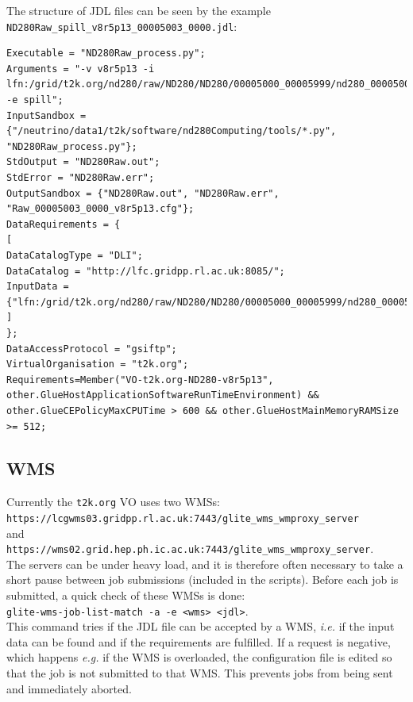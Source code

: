 \documentclass[11pt]{article}
\begin{document}
The structure of JDL files can be seen by the example \verb+ND280Raw_spill_v8r5p13_00005003_0000.jdl+:\\
\begin{verbatim}
Executable = "ND280Raw_process.py";
Arguments = "-v v8r5p13 -i
lfn:/grid/t2k.org/nd280/raw/ND280/ND280/00005000_00005999/nd280_00005003_0000.daq.mid.gz
-e spill";
InputSandbox = {"/neutrino/data1/t2k/software/nd280Computing/tools/*.py",
"ND280Raw_process.py"};
StdOutput = "ND280Raw.out";
StdError = "ND280Raw.err";
OutputSandbox = {"ND280Raw.out", "ND280Raw.err", "Raw_00005003_0000_v8r5p13.cfg"};
DataRequirements = {
[
DataCatalogType = "DLI";
DataCatalog = "http://lfc.gridpp.rl.ac.uk:8085/";
InputData =
{"lfn:/grid/t2k.org/nd280/raw/ND280/ND280/00005000_00005999/nd280_00005003_0000.daq.mid.gz"};
]
};
DataAccessProtocol = "gsiftp";
VirtualOrganisation = "t2k.org";
Requirements=Member("VO-t2k.org-ND280-v8r5p13",
other.GlueHostApplicationSoftwareRunTimeEnvironment) &&
other.GlueCEPolicyMaxCPUTime > 600 && other.GlueHostMainMemoryRAMSize >= 512;
\end{verbatim}

\subsection{WMS}
Currently the \verb+t2k.org+ VO uses two WMSs:\\
\verb+https://lcgwms03.gridpp.rl.ac.uk:7443/glite_wms_wmproxy_server+\\
and\\
\verb+https://wms02.grid.hep.ph.ic.ac.uk:7443/glite_wms_wmproxy_server+.\\
The servers can be under heavy load, and it is therefore often
necessary to take a short pause between job submissions (included in
the scripts). Before each job is submitted, a quick check of these
WMSs is done:\\
\verb+glite-wms-job-list-match -a -e <wms> <jdl>+.\\
This command tries if the JDL file can be accepted by a WMS,
\textit{i.e.} if the input data can be found and if the requirements
are fulfilled. If a request is negative, which happens \textit{e.g.}
if the WMS is overloaded, the configuration file is edited so that the
job is not submitted to that WMS. This prevents jobs from being sent
and immediately aborted.
\end{document}

